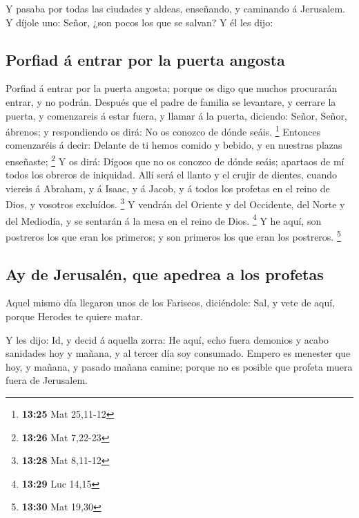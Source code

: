  Y pasaba por todas las ciudades y aldeas, enseñando, y
caminando á Jerusalem.  Y díjole uno: Señor, ¿son pocos los
que se salvan? Y él les dijo:

\hypertarget{porfiad-uxe1-entrar-por-la-puerta-angosta}{%
\subsection{Porfiad á entrar por la puerta
angosta}\label{porfiad-uxe1-entrar-por-la-puerta-angosta}}

 Porfiad á entrar por la puerta angosta; porque os digo que
muchos procurarán entrar, y no podrán.  Después que el
padre de familia se levantare, y cerrare la puerta, y comenzareis á
estar fuera, y llamar á la puerta, diciendo: Señor, Señor, ábrenos; y
respondiendo os dirá: No os conozco de dónde seáis. \footnote{\textbf{13:25}
  Mat 25,11-12}  Entonces comenzaréis á decir: Delante de
ti hemos comido y bebido, y en nuestras plazas enseñaste; \footnote{\textbf{13:26}
  Mat 7,22-23}  Y os dirá: Dígoos que no os conozco de
dónde seáis; apartaos de mí todos los obreros de iniquidad.
 Allí será el llanto y el crujir de dientes, cuando viereis
á Abraham, y á Isaac, y á Jacob, y á todos los profetas en el reino de
Dios, y vosotros excluídos. \footnote{\textbf{13:28} Mat 8,11-12}
 Y vendrán del Oriente y del Occidente, del Norte y del
Mediodía, y se sentarán á la mesa en el reino de Dios. \footnote{\textbf{13:29}
  Luc 14,15}  Y he aquí, son postreros los que eran los
primeros; y son primeros los que eran los postreros. \footnote{\textbf{13:30}
  Mat 19,30}

\hypertarget{ay-de-jerusaluxe9n-que-apedrea-a-los-profetas}{%
\subsection{Ay de Jerusalén, que apedrea a los
profetas}\label{ay-de-jerusaluxe9n-que-apedrea-a-los-profetas}}

 Aquel mismo día llegaron unos de los Fariseos, diciéndole:
Sal, y vete de aquí, porque Herodes te quiere matar.

 Y les dijo: Id, y decid á aquella zorra: He aquí, echo
fuera demonios y acabo sanidades hoy y mañana, y al tercer día soy
consumado.  Empero es menester que hoy, y mañana, y pasado
mañana camine; porque no es posible que profeta muera fuera de
Jerusalem.

